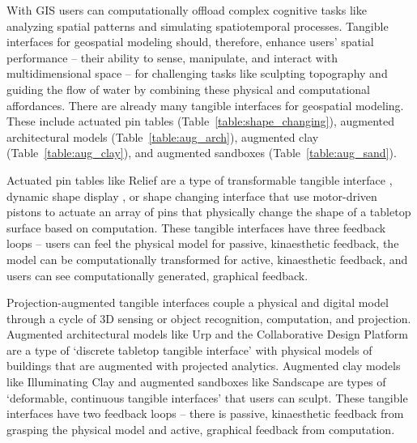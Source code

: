 \documentclass[prodmode,acmtochi]{acmsmall} %
\begin{document}

With GIS users can computationally offload complex cognitive tasks 
like analyzing spatial patterns and simulating spatiotemporal processes.
Tangible interfaces for geospatial modeling should, 
therefore, enhance users' spatial performance 
-- their ability to sense, manipulate, and interact with multidimensional space -- 
for challenging tasks 
like sculpting topography and guiding the flow of water
by combining these physical and computational affordances.
There are already many tangible interfaces for geospatial modeling.
These include 
actuated pin tables (Table~\ref{table:shape_changing}),
augmented architectural models (Table~\ref{table:aug_arch}), 
augmented clay (Table~\ref{table:aug_clay}), 
and augmented sandboxes (Table~\ref{table:aug_sand}).

Actuated pin tables
like Relief \cite{Leithinger2009}
are a type of transformable tangible interface \cite{Ishii2012}, 
dynamic shape display \cite{Poupyrev2007},
or shape changing interface \cite{Rasmussen2012}
that use motor-driven pistons to actuate an array of pins
that physically change the shape of a tabletop surface 
based on computation.
These tangible interfaces 
have three feedback loops --
users can feel the physical model for passive, kinaesthetic feedback,
the model can be computationally transformed for active, kinaesthetic feedback,
and users can see computationally generated, graphical feedback. 

Projection-augmented tangible interfaces 
couple a physical and digital model
through a cycle of 3D sensing or object recognition,
computation, and projection. 
Augmented architectural models
like Urp \cite{Underkoffler1999} 
and the Collaborative Design Platform \cite{Schubert2011}
are a type of 
`discrete tabletop tangible interface' \cite{Ishii2012}
with physical models of buildings 
that are augmented with projected analytics.
Augmented clay models 
like Illuminating Clay \cite{Piper2002a} 
and augmented sandboxes like Sandscape \cite{Ishii2004} 
are types of 
`deformable, continuous tangible interfaces' \cite{Ishii2012}
that users can sculpt. 
These tangible interfaces 
have two feedback loops -- 
there is passive, kinaesthetic feedback from grasping the physical model 
and active, graphical feedback from computation.
\end{document}
